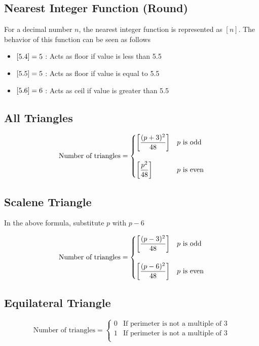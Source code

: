 \subsection{Nearest Integer Function (Round)}
For a decimal number $n$, the nearest integer function is represented as $\left [ n \right ]$. The behavior of this function can be seen as follows
\begin{itemize}
    \item $\left [ 5.4 \right ] = 5$ : Acts as floor if value is less than 5.5
    \item $\left [ 5.5 \right ] = 5$ : Acts as floor if value is equal to 5.5
    \item $\left [ 5.6 \right ] = 6$ : Acts as ceil if value is greater than 5.5
\end{itemize}

\subsection{All Triangles}
\begin{equation*}
    \text{Number of triangles} = 
    \begin{cases}
        \left [ \dfrac{(p+3)^2}{48} \right ] &\text{$p$ is odd} \\    \\
        \left [ \dfrac{p^2}{48} \right ] &\text{$p$ is even}     
    \end{cases}
\end{equation*}

\subsection{Scalene Triangle}
In the above formula, substitute $p$ with $p-6$

\begin{equation*}
    \text{Number of triangles} = 
    \begin{cases}
        \left [ \dfrac{(p - 3)^2}{48} \right ] &\text{$p$ is odd} \\    \\
        \left [ \dfrac{(p - 6)^2}{48} \right ] &\text{$p$ is even}   
    \end{cases}
\end{equation*}

\subsection{Equilateral Triangle}
\begin{equation*}
    \text{Number of triangles} = 
    \begin{cases}
        0 &\text{If perimeter is not a multiple of 3}    \\
        1 &\text{If perimeter is not a multiple of 3}    \\
    \end{cases}
\end{equation*}

